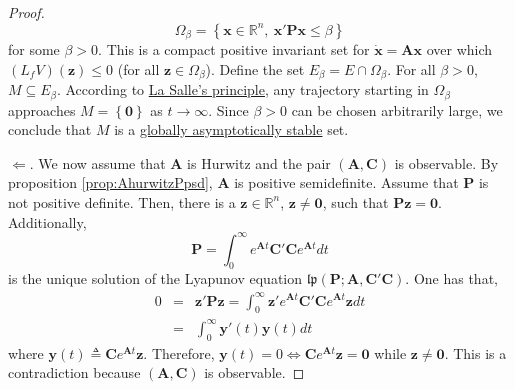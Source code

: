 \documentclass[a4paper,10pt,oneside]{book}
\begin{document}
\begin{proof}
\begin{equation}
 \Omega_\beta=\left\{\mathbf{x}\in\mathbb{R}^n,\ \mathbf{x}'\mathbf{Px}\leq \beta \right\}
\end{equation}
for some $\beta>0$. This is a compact positive invariant set for $\dot{\mathbf{x}}=\mathbf{Ax}$ over which
$(L_f V)(\mathbf{z})\leq 0$ (for all $\mathbf{z}\in \Omega_\beta$). Define the set $E_\beta=E\cap \Omega_\beta$.
For all $\beta>0$, $M\subseteq E_\beta$. According to \hyperlink{thm:LaSalle}{La Salle's principle}, any trajectory starting in
$\Omega_\beta$ approaches $M=\left\{\mathbf{0}\right\}$ as $t\to\infty$. Since $\beta>0$ can be chosen arbitrarily 
large, we conclude that $M$ is a \hyperlink{def:stableSet}{globally asymptotically stable} set.

$\Leftarrow.$ We now assume that $\mathbf{A}$ is Hurwitz and the pair $(\mathbf{A},\mathbf{C})$
is observable. By proposition \ref{prop:AhurwitzPpsd}, $\mathbf{A}$ is positive semidefinite.
Assume that $\mathbf{P}$ is not positive definite. Then, there is a $\mathbf{z}\in\mathbb{R}^n$,
$\mathbf{z}\neq \mathbf{0}$,
such that $\mathbf{Pz}=\mathbf{0}$. Additionally, 
\begin{equation}
 \mathbf{P}=\int_0^\infty e^{\mathbf{A}t}\mathbf{C}'\mathbf{C}e^{\mathbf{A}t}dt
\end{equation}
is the unique solution of the Lyapunov equation $\mathfrak{lp}(\mathbf{P};\mathbf{A},\mathbf{C}'\mathbf{C})$.
One has that,
\begin{eqnarray}
 0 &=& \mathbf{z}'\mathbf{Pz}=\int_0^\infty \mathbf{z}'e^{\mathbf{A}t}\mathbf{C}'\mathbf{C}e^{\mathbf{A}t}\mathbf{z}dt
\\ &=& \int_0^\infty \mathbf{y}'(t)\mathbf{y}(t)dt
\end{eqnarray}
where $\mathbf{y}(t)\triangleq \mathbf{C}e^{\mathbf{A}t}\mathbf{z}$. Therefore, $\mathbf{y}(t)=0\Leftrightarrow
\mathbf{C}e^{\mathbf{A}t}\mathbf{z}=\mathbf{0}$ while $\mathbf{z}\neq \mathbf{0}$. This is a contradiction
because $(\mathbf{A},\mathbf{C})$ is observable.
\end{proof}
\end{document}
